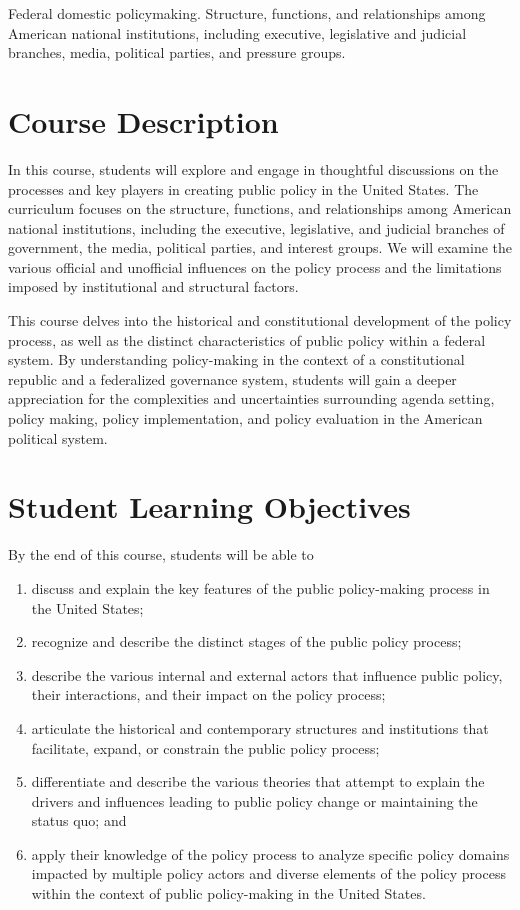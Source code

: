 \documentclass[12pt, letterpaper]{article}
\begin{document}
	Federal domestic policymaking. Structure, functions, and relationships among American national institutions, including executive, legislative and judicial branches, media, political parties, and pressure groups.

\section{Course Description}

	In this course, students will explore and engage in thoughtful discussions on the processes and key players in creating public policy in the United States. The curriculum focuses on the structure, functions, and relationships among American national institutions, including the executive, legislative, and judicial branches of government, the media, political parties, and interest groups. We will examine the various official and unofficial influences on the policy process and the limitations imposed by institutional and structural factors.

	\noindent This course delves into the historical and constitutional development of the policy process, as well as the distinct characteristics of public policy within a federal system. By understanding policy-making in the context of a constitutional republic and a federalized governance system, students will gain a deeper appreciation for the complexities and uncertainties surrounding agenda setting, policy making, policy implementation, and policy evaluation in the American political system.

\section{Student Learning Objectives}

By the end of this course, students will be able to

\begin{enumerate}
	\item discuss and explain the key features of the public policy-making process in the United States;
	\item recognize and describe the distinct stages of the public policy process;
	\item describe the various internal and external actors that influence public policy, their interactions, and their impact on the policy process;
	\item articulate the historical and contemporary structures and institutions that facilitate, expand, or constrain the public policy process;
	\item differentiate and describe the various theories that attempt to explain the drivers and influences leading to public policy change or maintaining the status quo; and
	\item apply their knowledge of the policy process to analyze specific policy domains impacted by multiple policy actors and diverse elements of the policy process within the context of public policy-making in the United States.
\end{enumerate}
\end{document}
